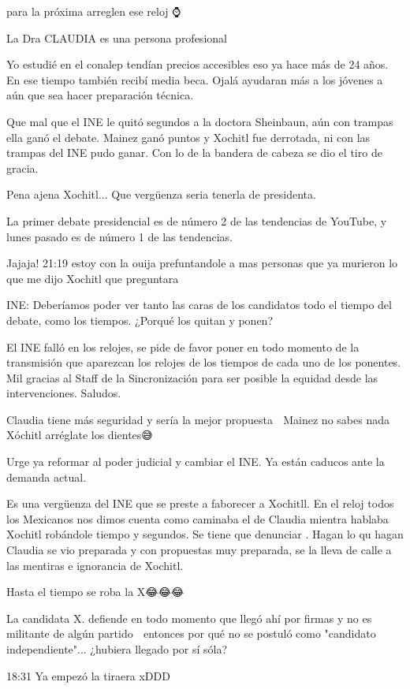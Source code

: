 para la próxima arreglen ese reloj ⌚️

La Dra CLAUDIA es una persona profesional

Yo estudié en el conalep tendían precios accesibles eso ya hace más de 24 años.  En ese tiempo también recibí media beca. Ojalá ayudaran más a los jóvenes a aún que sea hacer preparación técnica.

Que mal que el INE le quitó segundos a la doctora Sheinbaun, aún con trampas ella ganó el debate. Mainez ganó puntos y Xochitl fue derrotada, ni con las trampas del INE pudo ganar. Con lo de la bandera de cabeza se dio el tiro de gracia.

Pena ajena Xochitl... Que vergüenza seria tenerla de presidenta.

La primer debate presidencial es de número 2 de las tendencias de YouTube, y lunes pasado es de número 1 de las tendencias.

Jajaja! 21:19 estoy con la ouija prefuntandole a mas personas que ya murieron lo que me dijo Xochitl que preguntara

INE: Deberíamos poder ver tanto las caras de los candidatos todo el tiempo del debate, como los tiempos. ¿Porqué los quitan y ponen?

El INE falló en los relojes, se pide de favor poner en todo momento de la transmisión que aparezcan los relojes de los tiempos de cada uno de los ponentes.
Mil gracias al Staff de la Sincronización para ser posible la equidad desde las intervenciones.
Saludos.

Claudia tiene más seguridad y sería la mejor propuesta 🎉
Mainez no sabes nada
Xóchitl arréglate los dientes😅

Urge ya reformar al poder judicial y cambiar el INE. Ya están caducos ante la demanda actual.

Es una vergüenza del INE que se preste a faborecer a Xochitll. En el reloj todos los Mexicanos nos dimos cuenta como caminaba el de Claudia  mientra hablaba Xochitl robándole tiempo y segundos. Se tiene que denunciar . Hagan lo qu hagan  Claudia se vio preparada y con propuestas  muy preparada, se la lleva de calle a las mentiras e ignorancia de Xochitl.

Hasta el tiempo se roba la X😂😂😂

La candidata X. defiende en todo momento que llegó ahí por firmas y no es militante de algún partido 🤦 entonces por qué no se postuló como "candidato independiente"... ¿hubiera llegado por sí sóla?

18:31 Ya empezó la tiraera xDDD

